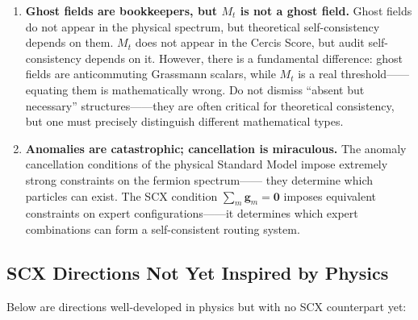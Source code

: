 \documentclass[12pt,a4paper]{article}
\theoremstyle{remark}
\newcommand{\gaugeparam}{\mathbf{g}}
\begin{document}
\begin{enumerate}[label=\textbf{Meta-Lesson \arabic*:}]
    \item \textbf{Ghost fields are bookkeepers, but $M_t$ is not a ghost field.}
    Ghost fields do not appear in the physical spectrum, but theoretical self-consistency depends on them. $M_t$ does not
    appear in the Cercis Score, but audit self-consistency depends on it. However, there is a fundamental difference:
    ghost fields are anticommuting Grassmann scalars, while $M_t$ is a real threshold——equating them is mathematically wrong.
    Do not dismiss ``absent but necessary'' structures——they are often critical for theoretical consistency,
    but one must precisely distinguish different mathematical types.

    \item \textbf{Anomalies are catastrophic; cancellation is miraculous.}
    The anomaly cancellation conditions of the physical Standard Model impose extremely strong constraints on the fermion spectrum——
    they determine which particles can exist. The SCX condition $\sum_m \gaugeparam_m = \mathbf{0}$
    imposes equivalent constraints on expert configurations——it determines which expert combinations can form a self-consistent routing system.
\end{enumerate}

\subsection{SCX Directions Not Yet Inspired by Physics}

Below are directions well-developed in physics but with no SCX counterpart yet:
\end{document}
